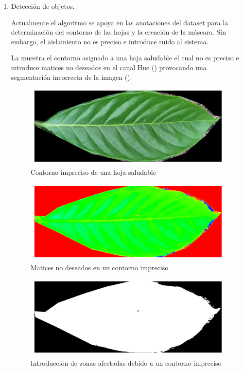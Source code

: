 \begin{enumerate}

\item Detección de objetos.

Actualmente el algoritmo se apoya en las anotaciones del dataset para la determinación del contorno de las hojas y la creación de la máscara. Sin embargo, el aislamiento no es preciso e introduce ruido al sistema.

La  muestra el contorno asignado a una hoja saludable el cual no es preciso e introduce matices no deseados en el canal Hue () provocando una segmentación incorrecta de la imagen ().

\begin{figure}[H]
\centering
\includegraphics[scale=1]{images/consideration_contour_rgb.png}
\caption{Contorno impreciso de una hoja saludable}
\label{img:issue_countour_rgb}
\end{figure}

\begin{figure}[H]
\centering
\includegraphics[scale=1]{images/consideration_contour_hue.png}
\caption{Matices no deseados en un contorno impreciso}
\label{img:issue_countour_hue}
\end{figure}

\begin{figure}[H]
\centering
\includegraphics[scale=1]{images/consideration_contour_binary.png}
\caption{Introducción de zonas afectadas debido a un contorno impreciso}
\label{img:issue_countour_binary}
\end{figure}


\end{enumerate}
